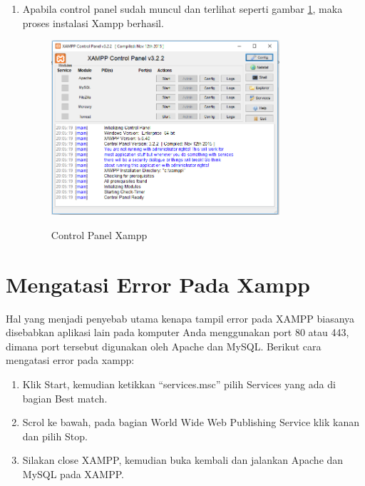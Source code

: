 \begin{enumerate}
	\item Apabila control panel sudah muncul dan terlihat seperti gambar \ref{Xampp9}, maka proses instalasi Xampp berhasil.
		\begin{figure}[!htbp]
    		\centering
    		\caption{Control Panel Xampp}
    		\includegraphics[width=0.8\textwidth]{figures/XAMPP/Xampp9.PNG}
    		\label{Xampp9}
		\end{figure}
\end{enumerate}

\section{Mengatasi Error Pada Xampp}
Hal yang menjadi penyebab utama kenapa tampil error pada XAMPP biasanya disebabkan aplikasi lain pada komputer Anda menggunakan port 80 atau 443, dimana port tersebut digunakan oleh Apache dan MySQL. Berikut cara mengatasi error pada xampp:
\begin{enumerate}
    \item Klik Start, kemudian ketikkan “services.msc” pilih Services yang ada di bagian Best match.
    \item Scrol ke bawah, pada bagian World Wide Web Publishing Service klik kanan dan pilih Stop.
    \item Silakan close XAMPP, kemudian buka kembali dan jalankan Apache dan MySQL pada XAMPP.
\end{enumerate}

